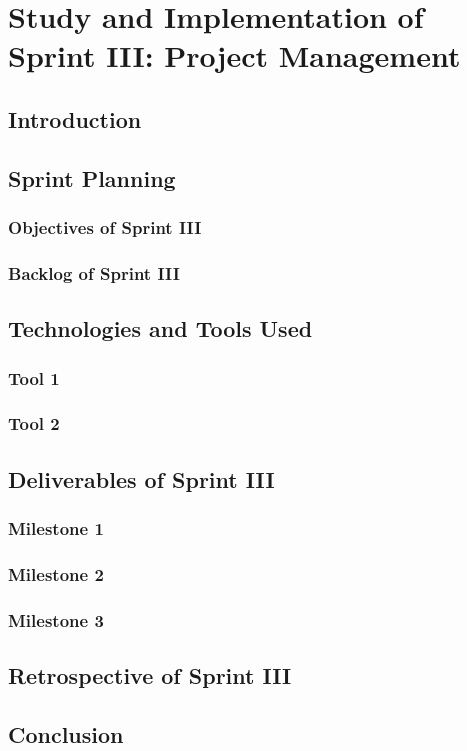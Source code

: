 \documentclass[a4paper,12pt]{report}
\begin{document}
\chapter{Study and Implementation of Sprint III: Project Management}

\section{Introduction}
\section{Sprint Planning}
\subsection{Objectives of Sprint III}
\subsection{Backlog of Sprint III}
\section{Technologies and Tools Used}
\subsection{Tool 1}
\subsection{Tool 2}
\section{Deliverables of Sprint III}
\subsection{Milestone 1}
\subsection{Milestone 2}
\subsection{Milestone 3}
\section{Retrospective of Sprint III}
\section{Conclusion}
\end{document}
